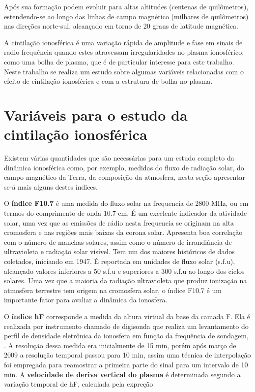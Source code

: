 Após sua formação podem evoluir para altas altitudes (centenas de quilômetros), estendendo-se ao longo das linhas de campo magnético (milhares de quilômetros) nas direções norte-sul, alcançado em torno de 20 graus de latitude magnética.


A cintilação ionosférica é uma variação rápida de amplitude e fase em sinais de radio frequência quando estes atravessam irregularidades no plasma ionosférico, como uma bolha de plasma, que é de particular interesse para este trabalho. Neste trabalho se realiza um estudo sobre algumas variáveis relacionadas com o efeito de cintilação ionosférica e com a estrutura de bolha no plasma.

\section{Variáveis para o estudo da cintilação ionosférica}

Existem várias quantidades que são necessárias para um estudo completo da dinâmica ionosférica como, por exemplo, medidas do fluxo de radiação solar, do campo magnético da Terra, da composição da atmosfera, nesta seção apresentar-se-á mais alguns destes índices.

O {\bf índice F10.7} é uma medida do fluxo solar na frequencia de 2800 MHz, ou em termos do comprimento de onda 10.7 cm. É um excelente indicador da atividade solar, uma vez que as emissões de rádio nesta frequencia se originam na alta cromosfera e nas regiões mais baixas da corona solar. Apresenta boa correlação com o número de manchas solares, assim como o número de irrandiância de ultravioleta e radiação solar visível. Tem um dos maiores históricos de dados coletados, iniciando em 1947. É reportada em unidades de fluxo solar (s.f.u), alcançado valores inferiores a 50 s.f.u e superiores a 300 s.f.u ao longo dos ciclos solares. Uma vez que a maioria da radiação ultravioleta que produz ionização na atmosfera terrestre tem origem na cromosfera solar, o índice F10.7 é um importante fator para avaliar a dinâmica da ionosfera.

O {\bf índice hF} corresponde a medida da altura virtual da base da camada F. Ela é realizada por instrumento chamado de digisonda que realiza um levantamento do perfil de densidade eletrônica da ionosfera em função da frequência de sondagem, \cite{BERTONI:1998}. A resolução dessa medida era inicialmente de 15 min, porém após março de 2009 a resolução temporal passou para 10 min, assim uma técnica de interpolação foi empregada para reamostrar a primeira parte do sinal para um intervalo de 10 min. A {\bf velocidade de deriva vertical do plasma} é determinada segundo a variação temporal de hF, calculada pela expreção

